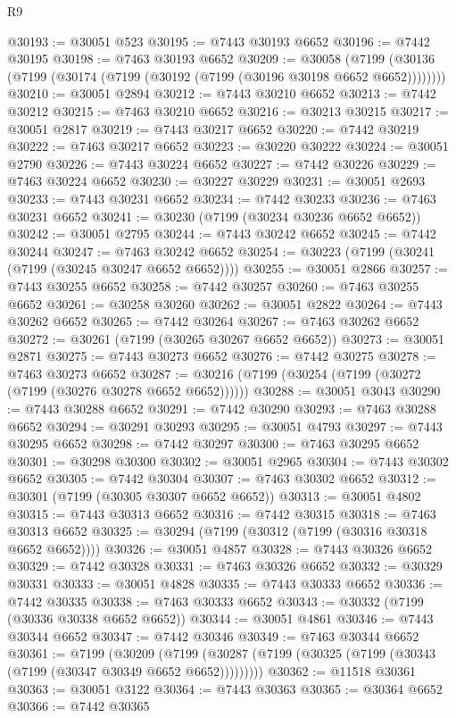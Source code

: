 \begin{lexlean}{R9}
\begin{coremodule}
@30193 := @30051 @523
@30195 := @7443 @30193 @6652
@30196 := @7442 @30195
@30198 := @7463 @30193 @6652
@30209 := @30058
    (@7199 (@30136 (@7199 (@30174 (@7199 (@30192 (@7199 (@30196 @30198 @6652 @6652))))))))
@30210 := @30051 @2894
@30212 := @7443 @30210 @6652
@30213 := @7442 @30212
@30215 := @7463 @30210 @6652
@30216 := @30213 @30215
@30217 := @30051 @2817
@30219 := @7443 @30217 @6652
@30220 := @7442 @30219
@30222 := @7463 @30217 @6652
@30223 := @30220 @30222
@30224 := @30051 @2790
@30226 := @7443 @30224 @6652
@30227 := @7442 @30226
@30229 := @7463 @30224 @6652
@30230 := @30227 @30229
@30231 := @30051 @2693
@30233 := @7443 @30231 @6652
@30234 := @7442 @30233
@30236 := @7463 @30231 @6652
@30241 := @30230 (@7199 (@30234 @30236 @6652 @6652))
@30242 := @30051 @2795
@30244 := @7443 @30242 @6652
@30245 := @7442 @30244
@30247 := @7463 @30242 @6652
@30254 := @30223 (@7199 (@30241 (@7199 (@30245 @30247 @6652 @6652))))
@30255 := @30051 @2866
@30257 := @7443 @30255 @6652
@30258 := @7442 @30257
@30260 := @7463 @30255 @6652
@30261 := @30258 @30260
@30262 := @30051 @2822
@30264 := @7443 @30262 @6652
@30265 := @7442 @30264
@30267 := @7463 @30262 @6652
@30272 := @30261 (@7199 (@30265 @30267 @6652 @6652))
@30273 := @30051 @2871
@30275 := @7443 @30273 @6652
@30276 := @7442 @30275
@30278 := @7463 @30273 @6652
@30287 := @30216 (@7199 (@30254 (@7199 (@30272 (@7199 (@30276 @30278 @6652 @6652))))))
@30288 := @30051 @3043
@30290 := @7443 @30288 @6652
@30291 := @7442 @30290
@30293 := @7463 @30288 @6652
@30294 := @30291 @30293
@30295 := @30051 @4793
@30297 := @7443 @30295 @6652
@30298 := @7442 @30297
@30300 := @7463 @30295 @6652
@30301 := @30298 @30300
@30302 := @30051 @2965
@30304 := @7443 @30302 @6652
@30305 := @7442 @30304
@30307 := @7463 @30302 @6652
@30312 := @30301 (@7199 (@30305 @30307 @6652 @6652))
@30313 := @30051 @4802
@30315 := @7443 @30313 @6652
@30316 := @7442 @30315
@30318 := @7463 @30313 @6652
@30325 := @30294 (@7199 (@30312 (@7199 (@30316 @30318 @6652 @6652))))
@30326 := @30051 @4857
@30328 := @7443 @30326 @6652
@30329 := @7442 @30328
@30331 := @7463 @30326 @6652
@30332 := @30329 @30331
@30333 := @30051 @4828
@30335 := @7443 @30333 @6652
@30336 := @7442 @30335
@30338 := @7463 @30333 @6652
@30343 := @30332 (@7199 (@30336 @30338 @6652 @6652))
@30344 := @30051 @4861
@30346 := @7443 @30344 @6652
@30347 := @7442 @30346
@30349 := @7463 @30344 @6652
@30361 := @7199
    (@30209 (@7199 (@30287 (@7199 (@30325 (@7199 (@30343 (@7199 (@30347 @30349 @6652 @6652)))))))))
@30362 := @11518 @30361
@30363 := @30051 @3122
@30364 := @7443 @30363
@30365 := @30364 @6652
@30366 := @7442 @30365

\end{coremodule}
\end{lexlean}
